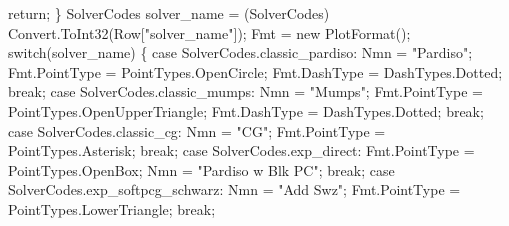 {\btab \btab \btab \btab return;\newline 
\btab \btab    \}\newline 
 \newline 
\btab \btab    SolverCodes solver\_name = (SolverCodes) Convert.ToInt32(Row["solver\_name"]);\newline 
\btab \btab    Fmt                     = new PlotFormat();\newline 
\btab \btab    switch(solver\_name) \{\newline 
\btab \btab    case SolverCodes.classic\_pardiso: \newline 
\btab \btab \btab    Nmn           = "Pardiso"; \newline 
\btab \btab \btab    Fmt.PointType = PointTypes.OpenCircle;\newline 
\btab \btab \btab    Fmt.DashType  = DashTypes.Dotted;\newline 
\btab \btab \btab    break;\newline 
\btab \btab    case SolverCodes.classic\_mumps: \newline 
\btab \btab \btab    Nmn           = "Mumps"; \newline 
\btab \btab \btab    Fmt.PointType = PointTypes.OpenUpperTriangle;\newline 
\btab \btab \btab    Fmt.DashType  = DashTypes.Dotted;\newline 
\btab \btab \btab    break;\newline 
\btab \btab    case SolverCodes.classic\_cg: \newline 
\btab \btab \btab    Nmn           = "CG"; \newline 
\btab \btab \btab    Fmt.PointType = PointTypes.Asterisk;\newline 
\btab \btab \btab    break;\newline 
\btab \btab    case SolverCodes.exp\_direct: \newline 
\btab \btab \btab    Fmt.PointType = PointTypes.OpenBox;\newline 
\btab \btab \btab    Nmn           = "Pardiso w Blk PC"; \newline 
\btab \btab \btab    break;\newline 
\btab \btab    case SolverCodes.exp\_softpcg\_schwarz: \newline 
\btab \btab \btab    Nmn           = "Add Swz"; \newline 
\btab \btab \btab    Fmt.PointType = PointTypes.LowerTriangle;\newline 
\btab \btab \btab    break;\newline 
}
